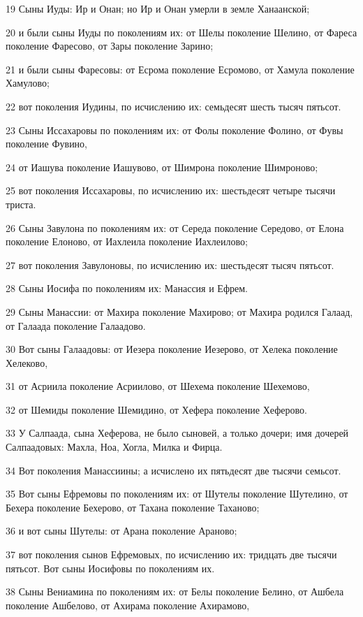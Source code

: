 \par 19 Сыны Иуды: Ир и Онан; но Ир и Онан умерли в земле Ханаанской;
\par 20 и были сыны Иуды по поколениям их: от Шелы поколение Шелино, от Фареса поколение Фаресово, от Зары поколение Зарино;
\par 21 и были сыны Фаресовы: от Есрома поколение Есромово, от Хамула поколение Хамулово;
\par 22 вот поколения Иудины, по исчислению их: семьдесят шесть тысяч пятьсот.
\par 23 Сыны Иссахаровы по поколениям их: от Фолы поколение Фолино, от Фувы поколение Фувино,
\par 24 от Иашува поколение Иашувово, от Шимрона поколение Шимроново;
\par 25 вот поколения Иссахаровы, по исчислению их: шестьдесят четыре тысячи триста.
\par 26 Сыны Завулона по поколениям их: от Середа поколение Середово, от Елона поколение Елоново, от Иахлеила поколение Иахлеилово;
\par 27 вот поколения Завулоновы, по исчислению их: шестьдесят тысяч пятьсот.
\par 28 Сыны Иосифа по поколениям их: Манассия и Ефрем.
\par 29 Сыны Манассии: от Махира поколение Махирово; от Махира родился Галаад, от Галаада поколение Галаадово.
\par 30 Вот сыны Галаадовы: от Иезера поколение Иезерово, от Хелека поколение Хелеково,
\par 31 от Асриила поколение Асриилово, от Шехема поколение Шехемово,
\par 32 от Шемиды поколение Шемидино, от Хефера поколение Хеферово.
\par 33 У Салпаада, сына Хеферова, не было сыновей, а только дочери; имя дочерей Салпаадовых: Махла, Ноа, Хогла, Милка и Фирца.
\par 34 Вот поколения Манассиины; а исчислено их пятьдесят две тысячи семьсот.
\par 35 Вот сыны Ефремовы по поколениям их: от Шутелы поколение Шутелино, от Бехера поколение Бехерово, от Тахана поколение Таханово;
\par 36 и вот сыны Шутелы: от Арана поколение Араново;
\par 37 вот поколения сынов Ефремовых, по исчислению их: тридцать две тысячи пятьсот. Вот сыны Иосифовы по поколениям их.
\par 38 Сыны Вениамина по поколениям их: от Белы поколение Белино, от Ашбела поколение Ашбелово, от Ахирама поколение Ахирамово,
